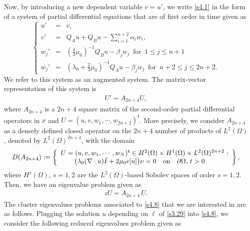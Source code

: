 \documentclass[a4paper,12pt]{article}
\newtheorem{a priori condition}[Th]{A priori condition}
\begin{document}
Now, by introducing a new dependent variable $v=u'$, we write \eqref{s4.1} in the form of a system of partial differential equations that are of first order in time given as
\begin{equation}\label{s4.5}
\left\{
\begin{array}{rcl}
u'&=&v,\\
v'&=&Q_A u +Q_B u-   \sum_{i=1}^{n+2} \alpha_iw_i,\\
w_j'&=&(\frac{4}{3}\mu_0)^{-1}Q_B u -\beta_jw_j\,\,\,\text{for}\,\,\, 1\leq j \leq n+1\\
w_j'&=&(\lambda_0+\frac{2}{3}\mu_0)^{-1}Q_A u -\beta_jw_j\,\,\,\text{for}\,\,\, n+2\leq j \leq 2n+2.
\end{array}
\right.
\end{equation}
We refer to this system as an augmented system. The matrix-vector representation of this system is \begin{equation}\label{s4.6}
\begin{aligned}
U'=A_{2n+4}U,
\end{aligned}
\end{equation}
where $A_{2n+4}$ is a $2n+4$ square matrix of the second-order partial differential operators in $x$ and $U=(u,v,w_1,\cdots,w_{2n+2})^{\mathfrak{t}}$. More precisely, we consider $A_{2n+4}$ as a densely defined closed operator on the $2n+4$ number of products of $L^2(\Omega)$, denoted by $L^2(\Omega)^{2n+4}$, with the domain
\begin{equation}\label{s4.7}
D(A_{2n+4}):=\left\{
\begin{array}{ll}
U=(u,v,w_1,\cdots,w_N)^{\mathfrak{t}}\in H^2(\Omega)\times H^1(\Omega)\times L^2(\Omega)^{2n+2}:\\
\qquad\big(\lambda_0(\nabla \cdot u)\tilde I+2\mu_0e[u]\big)\nu=0  \quad    {\rm on}\quad \partial \Omega,\,t>0
\end{array}
\right\},
\end{equation}
where $H^s(\Omega),\,s=1,2$ are the $L^2(\Omega)$-based  Sobolev spaces of order $s=1,2$. Then, we have an eigenvalue problem given as
\begin{equation}\label{s4.8}
\begin{aligned}
z U=A_{2n+4}\,U.
\end{aligned}
\end{equation}
The cluster eigenvalues problems associated to \eqref{s4.8} that we are interested in are as follows. Plugging the solution $u$ depending on $\ell$ of \eqref{s3.29} into \eqref{s4.8}, we consider the following reduced eigenvalues problem given as
\end{document}
